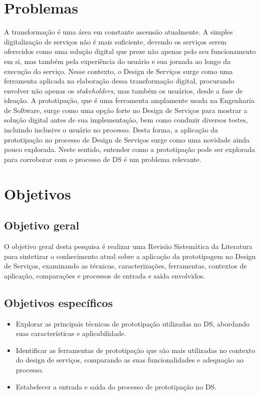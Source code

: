 \section {Problemas}

A transformação é uma área em constante ascensão atualmente. A simples digitalização de serviços não é mais suficiente, devendo os serviços serem oferecidos como uma solução digital que preze não apenas pelo seu funcionamento em si, mas também pela experiência do usuário e sua jornada ao longo da execução do serviço. Nesse contexto, o Design de Serviços surge como uma ferramenta aplicada na elaboração dessa transformação digital, procurando envolver não apenas os \textit{stakeholders}, mas também os usuários, desde a fase de ideação. A prototipação, que é uma ferramenta amplamente usada na Engenharia de Software, surge como uma opção forte no Design de Serviços para mostrar a solução digital antes de sua implementação, bem como conduzir diversos testes, incluindo inclusive o usuário no processo. Desta forma, a aplicação da prototipação no processo de Design de Serviços surge como uma novidade ainda pouco explorada. Neste sentido, entender como a prototipação pode ser explorada para corroborar com o processo de DS é um problema relevante.


\section {Objetivos}
\subsection{Objetivo geral}

O objetivo geral desta pesquisa é realizar uma Revisão Sistemática da Literatura para sintetizar o conhecimento atual sobre a aplicação da prototipagem no Design de Serviços, examinando as técnicas, caracterizações, ferramentas, contextos de aplicação, comparações e processos de entrada e saída envolvidos. %

\subsection{Objetivos específicos}

\begin{itemize}
	\item Explorar as principais técnicas de prototipação utilizadas no DS, abordando suas características e aplicabilidade.
	
	\item Identificar as ferramentas de prototipação que são mais utilizadas no contexto do design de serviços, comparando as suas funcionalidades e adequação ao processo.
	
	\item Estabelecer a entrada e saída do processo de prototipação no DS.%
\end{itemize}

